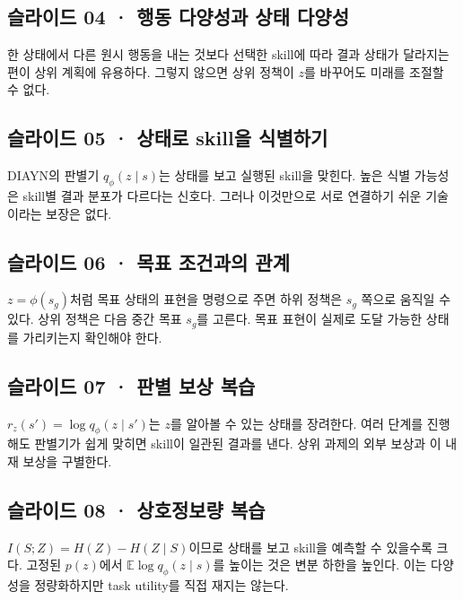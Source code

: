 \documentclass[11pt,a4paper]{article}
\begin{document}
\subsection{슬라이드 04 · 행동 다양성과 상태 다양성}

한 상태에서 다른 원시 행동을 내는 것보다 선택한 skill에 따라 결과 상태가 달라지는 편이 상위 계획에 유용하다. 그렇지 않으면 상위 정책이 $z$를 바꾸어도 미래를 조절할 수 없다.\par

\subsection{슬라이드 05 · 상태로 skill을 식별하기}

DIAYN의 판별기 $q_\phi(z\mid s)$는 상태를 보고 실행된 skill을 맞힌다. 높은 식별 가능성은 skill별 결과 분포가 다르다는 신호다. 그러나 이것만으로 서로 연결하기 쉬운 기술이라는 보장은 없다.\par

\subsection{슬라이드 06 · 목표 조건과의 관계}

$z=\phi(s_g)$처럼 목표 상태의 표현을 명령으로 주면 하위 정책은 $s_g$ 쪽으로 움직일 수 있다. 상위 정책은 다음 중간 목표 $s_g$를 고른다. 목표 표현이 실제로 도달 가능한 상태를 가리키는지 확인해야 한다.\par

\subsection{슬라이드 07 · 판별 보상 복습}

$r_z(s')=\log q_\phi(z\mid s')$는 $z$를 알아볼 수 있는 상태를 장려한다. 여러 단계를 진행해도 판별기가 쉽게 맞히면 skill이 일관된 결과를 낸다. 상위 과제의 외부 보상과 이 내재 보상을 구별한다.\par

\subsection{슬라이드 08 · 상호정보량 복습}

$I(S;Z)=H(Z)-H(Z\mid S)$이므로 상태를 보고 skill을 예측할 수 있을수록 크다. 고정된 $p(z)$에서 $\mathbb E\log q_\phi(z\mid s)$를 높이는 것은 변분 하한을 높인다. 이는 다양성을 정량화하지만 task utility를 직접 재지는 않는다.\par
\end{document}
